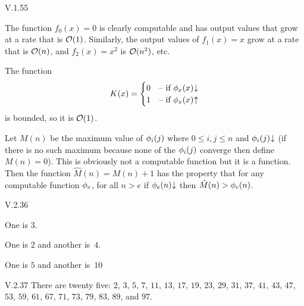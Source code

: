 \begin{ans}{V.1.55}
  \begin{exparts}
  \item The function $f_0(x)=0$ is clearly computable and has
    output values that grow at a rate that is $\operatorname*{\mathcal{O}}(1)$.
    Similarly, the output values of $f_1(x)=x$ grow
    at a rate that is $\operatorname*{\mathcal{O}}(n)$,
    and $f_2(x)=x^2$ is $\operatorname*{\mathcal{O}}(n^2)$, etc.
  \item The function
    \begin{equation*}
      K(x)=
      \begin{cases}
        0  &\case{if $\TMfcn_x(x)\converges$}  \\
        1  &\case{if $\TMfcn_x(x)\diverges$}
      \end{cases}
    \end{equation*}
    is bounded, so it is $\operatorname*{\mathcal{O}}(1)$.
  \item Let $M(n)$ be the maximum value of $\phi_i(j)$ where $0\leq i,j\leq n$
    and $\TMfcn_i(j)\converges$ (if there is no such maximum because none of
    the $\phi_i(j)$ converge then define $M(n)=0$).
    This is obviously not a computable function but it is a function.
    Then the function $\hat{M}(n)=M(n)+1$ has the property that for any
    computable function $\phi_e$,
    for all $n>e$ if $\TMfcn_e(n)\converges$ then $\hat{M}(n)>\phi_e(n)$.
  \end{exparts}
  
\end{ans}
%
%
%
%
%
\begin{ans}{V.2.36}
\begin{exparts}
\item One is $3$.
\item One is $2$ and another is~$4$.
\item One is $5$ and another is~$10$
\end{exparts}
\end{ans}
%
\begin{ans}{V.2.37}
There are twenty five:
$2$,
$3$,
$5$,
$7$,
$11$,
$13$,
$17$,
$19$,
$23$,
$29$,
$31$,
$37$,
$41$,
$43$,
$47$,
$53$,
$59$,
$61$,
$67$,
$71$,
$73$,
$79$,
$83$,
$89$,
and $97$.
\end{ans}
%
